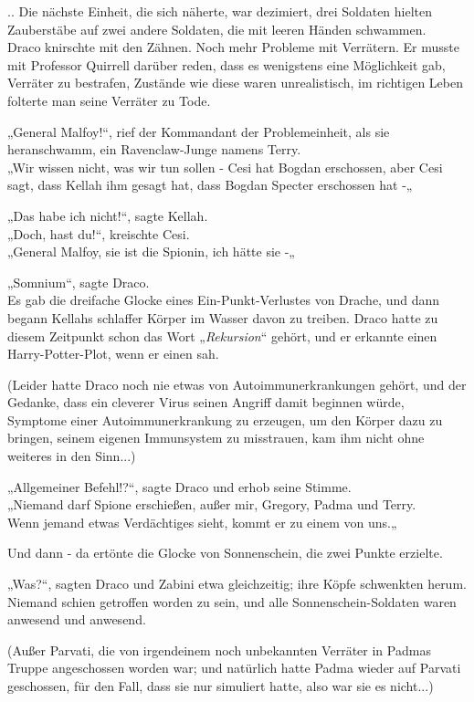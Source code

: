 {.. Die nächste Einheit, die sich näherte, war dezimiert, drei Soldaten hielten Zauberstäbe auf zwei andere Soldaten, die mit leeren Händen schwammen.\\ Draco knirschte mit den Zähnen. Noch mehr Probleme mit Verrätern. Er musste mit Professor Quirrell darüber reden, dass es wenigstens eine Möglichkeit gab, Verräter zu bestrafen, Zustände wie diese waren unrealistisch, im richtigen Leben folterte man seine Verräter zu Tode.

„General Malfoy!“, rief der Kommandant der Problemeinheit, als sie heranschwamm, ein Ravenclaw-Junge namens Terry.\\ „Wir wissen nicht, was wir tun sollen - Cesi hat Bogdan erschossen, aber Cesi sagt, dass Kellah ihm gesagt hat, dass Bogdan Specter erschossen hat -„

„Das habe ich nicht!“, sagte Kellah.\\ „Doch, hast du!“, kreischte Cesi.\\ „General Malfoy, sie ist die Spionin, ich hätte sie -„

„Somnium“, sagte Draco.\\ Es gab die dreifache Glocke eines Ein-Punkt-Verlustes von Drache, und dann begann Kellahs schlaffer Körper im Wasser davon zu treiben. Draco hatte zu diesem Zeitpunkt schon das Wort „\emph{Rekursion}“ gehört, und er erkannte einen Harry-Potter-Plot, wenn er einen sah.

(Leider hatte Draco noch nie etwas von Autoimmunerkrankungen gehört, und der Gedanke, dass ein cleverer Virus seinen Angriff damit beginnen würde, Symptome einer Autoimmunerkrankung zu erzeugen, um den Körper dazu zu bringen, seinem eigenen Immunsystem zu misstrauen, kam ihm nicht ohne weiteres in den Sinn...)

„Allgemeiner Befehl!?“, sagte Draco und erhob seine Stimme.\\ „Niemand darf Spione erschießen, außer mir, Gregory, Padma und Terry.\\ Wenn jemand etwas Verdächtiges sieht, kommt er zu einem von uns.„

Und dann - da ertönte die Glocke von Sonnenschein, die zwei Punkte erzielte.

„Was?“, sagten Draco und Zabini etwa gleichzeitig; ihre Köpfe schwenkten herum. Niemand schien getroffen worden zu sein, und alle Sonnenschein-Soldaten waren anwesend und anwesend.

(Außer Parvati, die von irgendeinem noch unbekannten Verräter in Padmas Truppe angeschossen worden war; und natürlich hatte Padma wieder auf Parvati geschossen, für den Fall, dass sie nur simuliert hatte, also war sie es nicht...)

}
